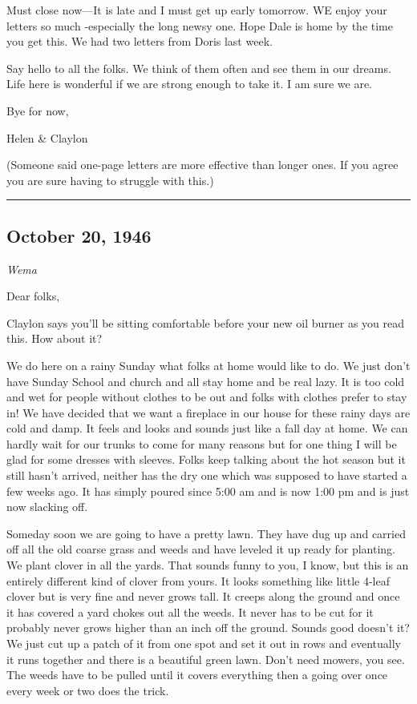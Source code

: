 \documentclass[
]{book}
\begin{document}
Must close now---It is late and I must get up early tomorrow. WE enjoy your letters so much -especially the long newsy one. Hope Dale is home by the time you get this. We had two letters from Doris last week.

Say hello to all the folks. We think of them often and see them in our dreams. Life here is wonderful if we are strong enough to take it. I am sure we are.

Bye for now,

Helen \& Claylon

(Someone said one-page letters are more effective than longer ones. If you agree you are sure having to struggle with this.)

\begin{center}\rule{0.5\linewidth}{0.5pt}\end{center}

\hypertarget{october-20-1946}{%
\subsection{October 20, 1946}\label{october-20-1946}}

\emph{Wema}

Dear folks,

Claylon says you'll be sitting comfortable before your new oil burner as you read this. How about it?

We do here on a rainy Sunday what folks at home would like to do. We just don't have Sunday School and church and all stay home and be real lazy. It is too cold and wet for people without clothes to be out and folks with clothes prefer to stay in! We have decided that we want a fireplace in our house for these rainy days are cold and damp. It feels and looks and sounds just like a fall day at home. We can hardly wait for our trunks to come for many reasons but for one thing I will be glad for some dresses with sleeves. Folks keep talking about the hot season but it still hasn't arrived, neither has the dry one which was supposed to have started a few weeks ago. It has simply poured since 5:00 am and is now 1:00 pm and is just now slacking off.

Someday soon we are going to have a pretty lawn. They have dug up and carried off all the old coarse grass and weeds and have leveled it up ready for planting. We plant clover in all the yards. That sounds funny to you, I know, but this is an entirely different kind of clover from yours. It looks something like little 4-leaf clover but is very fine and never grows tall. It creeps along the ground and once it has covered a yard chokes out all the weeds. It never has to be cut for it probably never grows higher than an inch off the ground. Sounds good doesn't it? We just cut up a patch of it from one spot and set it out in rows and eventually it runs together and there is a beautiful green lawn. Don't need mowers, you see. The weeds have to be pulled until it covers everything then a going over once every week or two does the trick.
\end{document}
